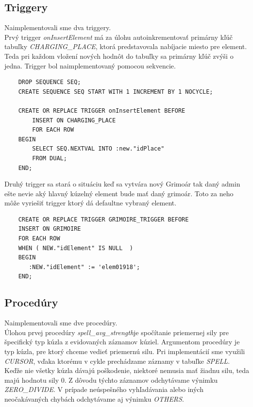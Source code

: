 \documentclass{article}
\begin{document}
    \subsection{Triggery}
    \Large{Naimplementovali sme dva triggery.}\\[0.2cm]
    \Large{Prvý trigger \textit{onInsertElement} má za úlohu autoinkrementovať primárny kľúč tabuľky \textit{CHARGING\_PLACE}, ktorá predstavovala nabíjacie miesto pre element. Teda pri každom vložení nových hodnôt do tabuľky sa primárny kľúč zvýši o jedna. Trigger bol naimplementovaný pomocou sekvencie.}\\
    \begin{verbatim}
    DROP SEQUENCE SEQ;
    CREATE SEQUENCE SEQ START WITH 1 INCREMENT BY 1 NOCYCLE;
    
    CREATE OR REPLACE TRIGGER onInsertElement BEFORE
        INSERT ON CHARGING_PLACE
        FOR EACH ROW
    BEGIN
        SELECT SEQ.NEXTVAL INTO :new."idPlace"
        FROM DUAL;
    END;
    \end{verbatim}
    \Large{Druhý trigger sa stará o situáciu keď sa vytvára nový Grimoár tak daný admin ešte nevie aký hlavný kúzelný element bude mať daný grimoár. Toto za neho môže vyriešiť trigger ktorý dá defaultne vybraný element.}
    \begin{verbatim}
    CREATE OR REPLACE TRIGGER GRIMOIRE_TRIGGER BEFORE
    INSERT ON GRIMOIRE
    FOR EACH ROW
    WHEN ( NEW."idElement" IS NULL  )
    BEGIN
       :NEW."idElement" := 'elem01918';
    END;
    \end{verbatim}
    \newpage
    
    
    \subsection{Procedúry}
    \Large{Naimplementovali sme dve procedúry.}\\[0.2cm]
    \Large{Úlohou prvej procedúry \textit{spell\_avg\_strength}je spočítanie priemernej sily pre špecifický typ kúzla z evidovaných záznamov kúziel. Argumentom procedúry je typ kúzla, pre ktorý chceme vedieť priemernú silu. Pri implementácií sme využili \textit{CURSOR}, vďaka ktorému v cykle prechádzame záznamy v tabuľke \textit{SPELL}. Keďže nie všetky kúzla dávajú poškodenie, niektoré nemusia mať žiadnu silu, teda majú hodnotu sily 0. Z dôvodu týchto záznamov odchytávame výnimku \textit{ZERO\_DIVIDE}. V prípade neúspešného vyhľadávania alebo iných neočakávaných chybách odchytávame aj výnimku \textit{OTHERS}.}\\[1cm]
\end{document}
